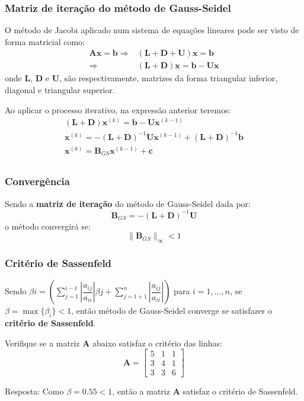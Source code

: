 \documentclass{beamer}
\theoremstyle{mystyle}
\begin{document}
\begin{frame}
	\frametitle{Matriz de iteração do método de Gauss-Seidel}
	O método de Jacobi aplicado num sistema de equações lineares pode ser visto de forma matricial como:
	\begin{align*}
		\mathbf{A}\mathbf{x} = \mathbf{b} \Rightarrow&  \left( \mathbf{L} + \mathbf{D} + \mathbf{U}\right) \mathbf{x} = \mathbf{b} \\
		\Rightarrow&  \left( \mathbf{L} + \mathbf{D}\right)\mathbf{x} = \mathbf{b} - \mathbf{U} \mathbf{x}
	\end{align*}
	onde \textbf{L}, \textbf{D} e \textbf{U}, são respectivamente, matrizes da forma triangular inferior, diagonal e triangular superior.
	
	Ao aplicar o processo iterativo, na expressão anterior teremos:
	\begin{gather*}
		\left( \mathbf{L} + \mathbf{D}\right)\mathbf{x}^{(k)} = \mathbf{b} - \mathbf{U} \mathbf{x}^{(k-1)}\\
		\mathbf{x}^{(k)} = - \left( \mathbf{L} + \mathbf{D}\right)^{-1} \mathbf{U} \mathbf{x}^{(k-1)}  + \left( \mathbf{L} + \mathbf{D}\right)^{-1} \mathbf{b}\\
		\mathbf{x}^{(k)} =  \mathbf{B}_{GS} \mathbf{x}^{(k-1)} + \mathbf{c}  \\
	\end{gather*}
\end{frame}

\begin{frame}
	\frametitle{Convergência}
	Sendo a \textbf{matriz de iteração} do método de Gauss-Seidel dada por:
	\begin{equation*}
		\mathbf{B}_{GS} = - \left( \mathbf{L} + \mathbf{D}\right)^{-1} \mathbf{U}
	\end{equation*}
	o método convergirá se:
	\begin{equation*}
		\|\mathbf{B}_{GS}\|_{\infty} < 1
	\end{equation*}
\end{frame}

\begin{frame}
	\frametitle{Critério de Sassenfeld}
	Sendo $ \beta{i} = \left( \sum_{j=1}^{i-1} \left| \dfrac{a_{ij}}{a_{ii}}\right|\beta{j} + \sum_{j=1+1}^{n} \left| \dfrac{a_{ij}}{a_{ii}}\right| \right) $ para $ i = 1,\dots,n $, se $ \beta = \max\{\beta_{i}\} < 1 $, então método de Gauss-Seidel converge se satisfazer o \textbf{critério de Sassenfeld}.	
	
	Verifique se a matriz \textbf{A} abaixo satisfaz o critério das linhas:
	\begin{equation*}
		\mathbf{A} = \left[
		\begin{array}{ccc}
			5 & 1 & 1 \\
			3 & 4 & 1 \\
			3 & 3 & 6 
		\end{array}
		\right]
	\end{equation*}
	\pause
	
	Resposta: Como $ \beta = 0.55 < 1 $, então a matriz \textbf{A} satisfaz o critério de Sassenfeld.
\end{frame}
\end{document}
